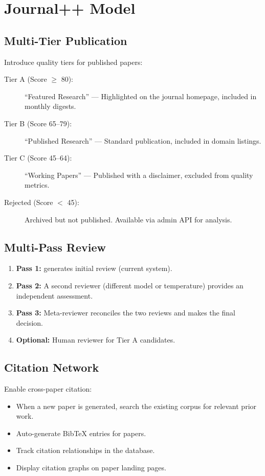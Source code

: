 \section{Journal++ Model}
\label{sec:improve:journal}

\subsection{Multi-Tier Publication}

Introduce quality tiers for published papers:

\begin{description}
  \item[Tier A (Score $\geq$ 80):] ``Featured Research'' --- Highlighted on the journal homepage, included in monthly digests.
  \item[Tier B (Score 65--79):] ``Published Research'' --- Standard publication, included in domain listings.
  \item[Tier C (Score 45--64):] ``Working Papers'' --- Published with a disclaimer, excluded from quality metrics.
  \item[Rejected (Score $<$ 45):] Archived but not published. Available via admin API for analysis.
\end{description}

\subsection{Multi-Pass Review}

\begin{enumerate}
  \item \textbf{Pass 1:} \popper generates initial review (current system).
  \item \textbf{Pass 2:} A second reviewer (different model or temperature) provides an independent assessment.
  \item \textbf{Pass 3:} Meta-reviewer reconciles the two reviews and makes the final decision.
  \item \textbf{Optional:} Human reviewer for Tier A candidates.
\end{enumerate}

\subsection{Citation Network}

Enable cross-paper citation:
\begin{itemize}
  \item When a new paper is generated, search the existing corpus for relevant prior work.
  \item Auto-generate BibTeX entries for \autoscholar papers.
  \item Track citation relationships in the database.
  \item Display citation graphs on paper landing pages.
\end{itemize}

